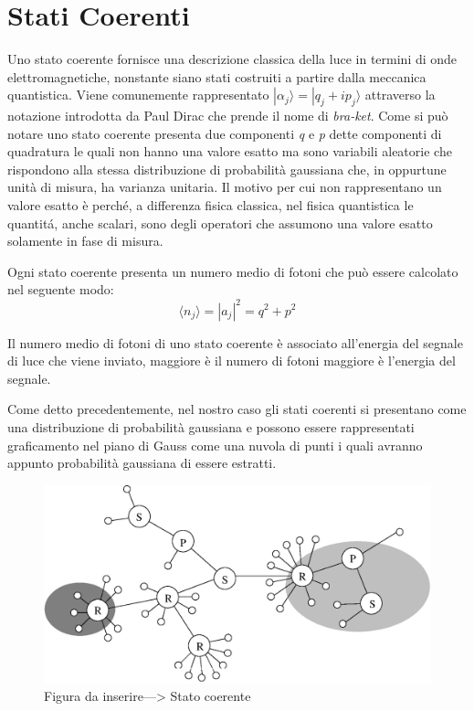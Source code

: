 \section{Stati Coerenti}
Uno stato coerente fornisce una descrizione classica della luce in termini di onde elettromagnetiche, nonstante siano stati costruiti a partire dalla meccanica quantistica. Viene comunemente rappresentato $|\alpha_j \rangle = |q_j + ip_j \rangle $ attraverso la notazione introdotta da Paul Dirac che prende il nome di \textit{bra-ket}. Come si pu\`o notare uno stato coerente presenta due componenti \textit{q} e \textit{p} dette componenti di quadratura le quali non hanno una valore esatto ma sono variabili aleatorie che rispondono alla stessa distribuzione di probabilit\`a gaussiana che, in oppurtune unit\`a di misura, ha varianza unitaria. Il motivo per cui non rappresentano un valore esatto \`e perch\'e, a differenza fisica classica, nel fisica quantistica le quantit\'a, anche scalari, sono degli operatori che assumono una valore esatto solamente in fase di misura.

Ogni stato coerente presenta un numero medio di fotoni che pu\`o essere calcolato nel seguente modo:
\begin{equation}
\langle n_j \rangle = |a_j|^2 = q^2 + p^2 
\end{equation}

Il numero medio di fotoni di uno stato coerente \`e associato all'energia del segnale di luce che viene inviato, maggiore \`e il numero di fotoni maggiore \`e l'energia del segnale.

Come detto precedentemente, nel nostro caso gli stati coerenti si presentano come una distribuzione di probabilit\`a gaussiana e possono essere rappresentati graficamento nel piano di Gauss come una nuvola di punti i quali avranno appunto probabilit\`a gaussiana di essere estratti.


\begin{figure}[ht] 
\includegraphics[scale=0.5]{figure/esempio-figura-1.eps}
\caption{Figura da inserire---> Stato coerente} \label{fig:stato-coerente}
\end{figure}

